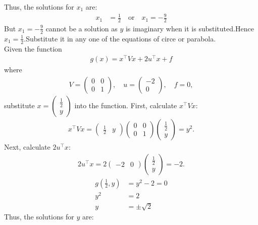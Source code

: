 \documentclass[journal]{IEEEtran}
\numberwithin{equation}{enumi}
\numberwithin{figure}{enumi}
\begin{document}
Thus, the solutions for $x_1$ are:
\begin{align}
x_1 &= \frac{1}{2} \quad \text{or} \quad x_1 = -\frac{9}{2}
\end{align}
But $x_1 = -\frac{9}{2}$ cannot be a solution as $y$ is imaginary when it is substituted.Hence $x_1 = \frac{1}{2}$.Substitute it in any one of the equations of circe or parabola.\\
Given the function 
\begin{align}
g(x) = x^\top V x + 2 u^\top x + f
\end{align}
where 
\begin{align}
V = \begin{pmatrix} 0 & 0 \\ 0 & 1 \end{pmatrix}, \quad u = \begin{pmatrix} -2 \\ 0 \end{pmatrix}, \quad f = 0,
\end{align}
substitute \( x = \begin{pmatrix} \frac{1}{2} \\ y \end{pmatrix} \) into the function. First, calculate \( x^\top V x \):
\begin{align}
x^\top V x = \begin{pmatrix} \frac{1}{2} & y \end{pmatrix} \begin{pmatrix} 0 & 0 \\ 0 & 1 \end{pmatrix} \begin{pmatrix} \frac{1}{2} \\ y \end{pmatrix} = y^2.
\end{align}
Next, calculate \( 2 u^\top x \):
\begin{align}
2 u^\top x = 2 \begin{pmatrix} -2 & 0 \end{pmatrix} \begin{pmatrix} \frac{1}{2} \\ y \end{pmatrix} = -2.
\end{align}
\begin{align}
g\left( \frac{1}{2}, y \right) &= y^2 - 2 = 0 \\
y^2 &= 2 \\
y &= \pm \sqrt{2}
\end{align}
Thus, the solutions for $y$ are:
\end{document}
